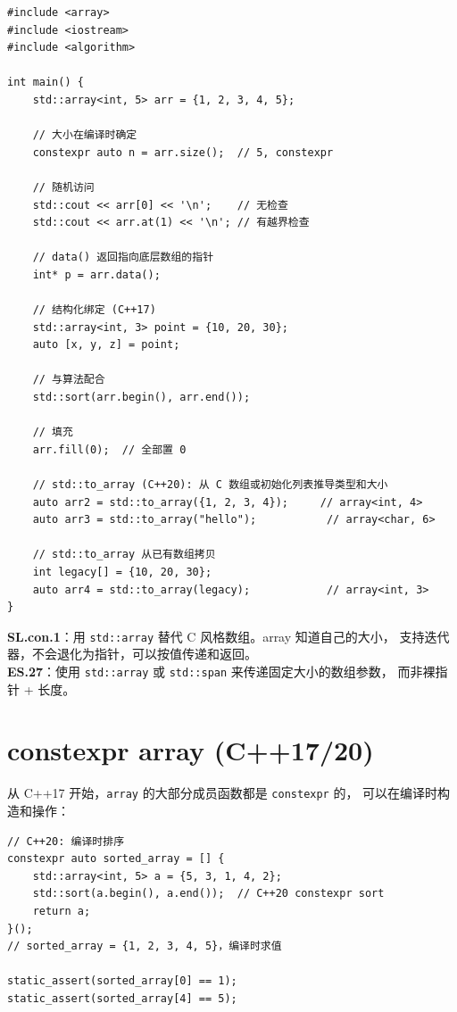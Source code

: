 \documentclass[12pt,a4paper,fontset=fandol]{ctexbook}
\newcommand{\cpp}[1]{C++#1}
\newcommand{\Tp}[1]{\texttt{#1}}
\begin{document}
\begin{lstlisting}
#include <array>
#include <iostream>
#include <algorithm>

int main() {
    std::array<int, 5> arr = {1, 2, 3, 4, 5};

    // 大小在编译时确定
    constexpr auto n = arr.size();  // 5, constexpr

    // 随机访问
    std::cout << arr[0] << '\n';    // 无检查
    std::cout << arr.at(1) << '\n'; // 有越界检查

    // data() 返回指向底层数组的指针
    int* p = arr.data();

    // 结构化绑定 (C++17)
    std::array<int, 3> point = {10, 20, 30};
    auto [x, y, z] = point;

    // 与算法配合
    std::sort(arr.begin(), arr.end());

    // 填充
    arr.fill(0);  // 全部置 0

    // std::to_array (C++20): 从 C 数组或初始化列表推导类型和大小
    auto arr2 = std::to_array({1, 2, 3, 4});     // array<int, 4>
    auto arr3 = std::to_array("hello");           // array<char, 6>

    // std::to_array 从已有数组拷贝
    int legacy[] = {10, 20, 30};
    auto arr4 = std::to_array(legacy);            // array<int, 3>
}
\end{lstlisting}

\begin{guideline}
\textbf{SL.con.1}：用 \texttt{std::array} 替代 C 风格数组。array 知道自己的大小，
支持迭代器，不会退化为指针，可以按值传递和返回。\\
\textbf{ES.27}：使用 \texttt{std::array} 或 \texttt{std::span} 来传递固定大小的数组参数，
而非裸指针 + 长度。
\end{guideline}

\section{constexpr array (C++17/20)}

从 \cpp{17} 开始，\Tp{array} 的大部分成员函数都是 \texttt{constexpr} 的，
可以在编译时构造和操作：

\begin{lstlisting}
// C++20: 编译时排序
constexpr auto sorted_array = [] {
    std::array<int, 5> a = {5, 3, 1, 4, 2};
    std::sort(a.begin(), a.end());  // C++20 constexpr sort
    return a;
}();
// sorted_array = {1, 2, 3, 4, 5}，编译时求值

static_assert(sorted_array[0] == 1);
static_assert(sorted_array[4] == 5);
\end{lstlisting}
\end{document}
